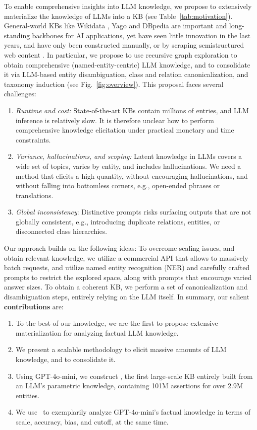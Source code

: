 To enable comprehensive insights into LLM knowledge, we propose to extensively materialize the knowledge of LLMs into a KB (see Table~\ref{tab:motivation}). General-world KBs like Wikidata \cite{wikidata}, Yago \cite{yago} and DBpedia \cite{dbpedia} are important and long-standing backbones for AI applications, yet have seen little innovation in the last years, and have only been constructed manually, or by scraping semistructured web content \cite{machine-knowledge}.
In particular, we propose to use recursive graph exploration to obtain comprehensive (named-entity-centric) LLM knowledge, and to consolidate it via LLM-based entity disambiguation, class and relation canonicalization, and taxonomy induction (see Fig.~\ref{fig:overview}). This proposal faces several challenges:
\begin{enumerate}
    \item \textit{Runtime and cost:} State-of-the-art KBs contain millions of entries, and LLM inference is relatively slow. It is therefore unclear how to perform comprehensive knowledge elicitation under practical monetary and time constraints.
    \item \textit{Variance, hallucinations, and scoping:} Latent knowledge in LLMs covers a wide set of topics, varies by entity, and includes hallucinations. We need a method that elicits a high quantity, without encouraging hallucinations, and without falling into bottomless corners, e.g., open-ended phrases or translations. 
    \item \textit{Global inconsistency}: Distinctive prompts risks surfacing outputs that are not globally consistent, e.g., introducing duplicate relations, entities, or disconnected class hierarchies.
\end{enumerate}
Our approach builds on the following ideas: To overcome scaling issues, and obtain relevant knowledge, we utilize a commercial API that allows to massively batch requests, and utilize named entity recognition (NER) and carefully crafted prompts to restrict the explored space, along with prompts that encourage varied answer sizes. To obtain a coherent KB, we perform a set of canonicalization and disambiguation steps, entirely relying on the LLM itself. In summary, our salient \textbf{contributions} are:
\begin{enumerate}
    \item To the best of our knowledge, we are the first to propose  extensive materialization for analyzing factual LLM knowledge.
    \item We present a scalable methodology to elicit massive amounts of LLM knowledge, and to consolidate it.
    \item Using GPT-4o-mini, we construct \ourkb, the first large-scale KB entirely built from an LLM's parametric knowledge, containing 101M assertions for over 2.9M entities. 
    \item We use \ourkb\ to exemplarily analyze GPT-4o-mini's factual knowledge in terms of scale, accuracy, bias, and cutoff, at the same time.
\end{enumerate}
